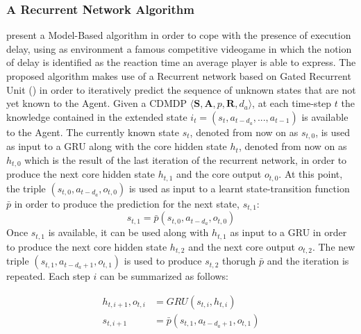             \subsubsection{A Recurrent Network Algorithm}
                \label{subsub:modelbased_recurrent}            
                 present a Model-Based algorithm in order to cope with the presence of execution delay, using as environment a famous competitive videogame in which the notion of delay is identified as the reaction time an average player is able to express. The proposed algorithm makes use of a Recurrent network based on Gated Recurrent Unit () in order to iteratively predict the sequence of unknown states that are not yet known to the Agent. Given a CDMDP $\langle \mathbf{S}, \mathbf{A}, p, \mathbf{R}, d_a\rangle$, at each time-step $t$ the knowledge contained in the extended state $i_t = \left( s_{t}, a_{t-d_a},..., a_{t-1}\right)$ is available to the Agent. The currently known state $s_t$, denoted from now on as $s_{t, 0}$, is used as input to a GRU along with the core hidden state $h_t$, denoted from now on as $h_{t, 0}$ which is the result of the last iteration of the recurrent network, in order to produce the next core hidden state $h_{t, 1}$ and the core output $o_{t, 0}$. At this point, the triple $(s_{t, 0}, a_{t-d_a}, o_{t, 0})$ is used as input to a learnt state-transition function $\bar{p}$ in order to produce the prediction for the next state, $s_{t, 1}$:
                \[ s_{t, 1} = \bar{p}(s_{t, 0}, a_{t-d_a}, o_{t, 0}) \]
                Once $s_{t, 1}$ is available, it can be used along with $h_{t, 1}$ as input to a GRU in order to produce the next core hidden state $h_{t, 2}$ and the next core output $o_{t, 2}$. The new triple $(s_{t, 1}, a_{t-d_a+1}, o_{t, 1})$ is used to produce $s_{t, 2}$ thorugh $\bar{p}$ and the iteration is repeated. Each step $i$ can be summarized as follows:
                
                \begin{align*}
                    h_{t, i+1}, o_{t, i} &= GRU(s_{t, i}, h_{t, i})\\
                    s_{t, i+1} &= \bar{p}(s_{t, 1}, a_{t-d_a+1}, o_{t, 1})
                \end{align*}
                
